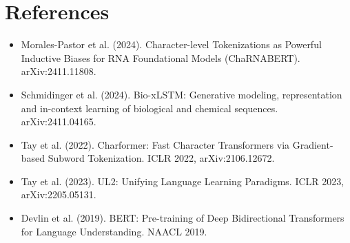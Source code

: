 \documentclass[11pt,a4paper]{article}
\begin{document}
\section*{References}
\small
\begin{itemize}[leftmargin=*]
\item Morales-Pastor et al. (2024). Character-level Tokenizations as Powerful Inductive Biases for
  RNA Foundational Models (ChaRNABERT). arXiv:2411.11808.
\item Schmidinger et al. (2024). Bio-xLSTM: Generative modeling, representation and in-context
  learning of biological and chemical sequences. arXiv:2411.04165.
\item Tay et al. (2022). Charformer: Fast Character Transformers via Gradient-based Subword
  Tokenization. ICLR 2022, arXiv:2106.12672.
\item Tay et al. (2023). UL2: Unifying Language Learning Paradigms. ICLR 2023, arXiv:2205.05131.
\item Devlin et al. (2019). BERT: Pre-training of Deep Bidirectional Transformers for Language
  Understanding. NAACL 2019.
\end{itemize}
\end{document}
